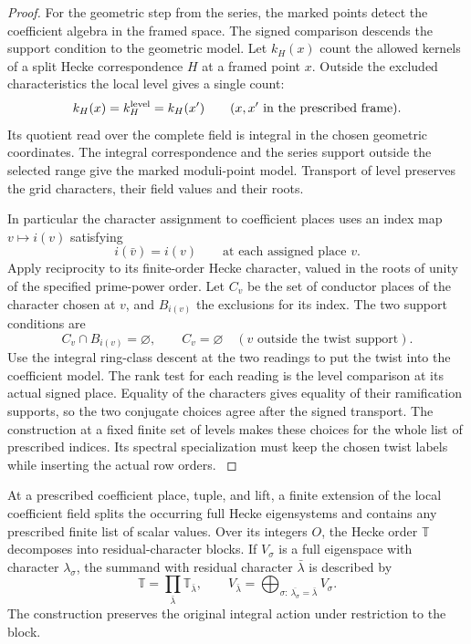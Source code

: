 \begin{proof}
For the geometric step from the series, the marked
points detect the coefficient algebra in the framed
space. The signed comparison descends the support
condition to the geometric model. Let \(k_H(x)\) count the allowed kernels of a split Hecke correspondence \(H\) at a framed point \(x\). Outside the excluded characteristics the local level gives a single count: 
\[
 k_H(x)=k_H^{\rm level}=k_H(x')\qquad(x,x'\text{ in the prescribed frame}).
\]
 Its quotient read over the
complete field is integral in the chosen geometric
coordinates. The integral correspondence and the series support outside the selected range give the marked moduli-point model. Transport of level preserves the grid characters, their field values and their roots. \label{cor:automorphic-realization-32}

In particular the character assignment to coefficient places uses an index map \(v\mapsto i(v)\) satisfying
\[
 i(\bar v)=i(v)\qquad\text{at each assigned place }v .
\] Apply reciprocity to its finite-order Hecke
character, valued in the roots of unity of the specified
prime-power order. Let \(C_v\) be the set of conductor places of the character chosen
at \(v\), and \(B_{i(v)}\) the exclusions for its index. The two
support conditions are
\[
 C_v\cap B_{i(v)}=\varnothing,\qquad
 C_v=\varnothing\quad(v\text{ outside the twist support}).
\] Use the
integral ring-class descent at the two readings to put
the twist into the coefficient model. The rank test
for each reading is the level comparison at its actual
signed place. Equality of the characters gives equality
of their ramification supports, so the two conjugate
choices agree after the signed transport. The construction
at a fixed finite set of levels makes these choices for
the whole list of prescribed indices. Its spectral
specialization must keep the chosen twist labels while
inserting the actual row orders.
\label{cor:automorphic-realization-33}

\end{proof}

\begin{proposition}\label{prop:marked-hecke-localization}
At a prescribed coefficient place, tuple, and lift, a finite
extension of the local coefficient field splits the occurring
full Hecke eigensystems and contains any prescribed finite list
of scalar values. Over its integers \(O\), the Hecke order \(\mathbb T\) decomposes into residual-character blocks. If \(V_\sigma\) is a full eigenspace with character \(\lambda_\sigma\), the summand with residual character \(\bar\lambda\) is described by
\[
 \mathbb T=\prod_{\bar\lambda}\mathbb T_{\bar\lambda},\qquad V_{\bar\lambda}=\bigoplus_{\sigma:\,\overline{\lambda_\sigma}=\bar\lambda} V_\sigma.
\] The construction preserves the original
integral action under restriction to the block.
\end{proposition}


